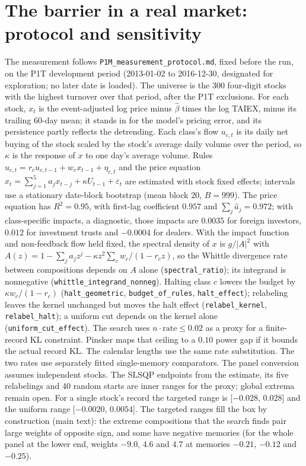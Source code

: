 \documentclass[12pt]{article}
\theoremstyle{definition}
\theoremstyle{remark}
\begin{document}
\section{The barrier in a real market: protocol and sensitivity}\label{app:barrier}

The measurement follows \nolinkurl{P1M_measurement_protocol.md}, fixed before the run, on the P1T development period (2013-01-02 to 2016-12-30, designated for exploration; no later date is loaded). The universe is the 300 four-digit stocks with the highest turnover over that period, after the P1T exclusions. For each stock, $x_t$ is the event-adjusted log price minus $\hat\beta$ times the log TAIEX, minus its trailing 60-day mean; it stands in for the model's pricing error, and its persistence partly reflects the detrending. Each class's flow $u_{c,t}$ is its daily net buying of the stock scaled by the stock's average daily volume over the period, so $\kappa$ is the response of $x$ to one day's average volume. Rules $u_{c,t}=r_cu_{c,t-1}+w_cx_{t-1}+\eta_{c,t}$ and the price equation $x_t=\sum_{j=1}^5a_jx_{t-j}+\kappa U_{t-1}+\varepsilon_t$ are estimated with stock fixed effects; intervals use a stationary date-block bootstrap (mean block 20, $B=999$). The price equation has $R^2=0.95$, with first-lag coefficient $0.957$ and $\sum_j\hat a_j=0.972$; with class-specific impacts, a diagnostic, those impacts are $0.0035$ for foreign investors, $0.012$ for investment trusts and $-0.0004$ for dealers. With the impact function and non-feedback flow held fixed, the spectral density of $x$ is $g/|A|^2$ with $A(z)=1-\sum_ja_jz^j-\kappa z^{2}\sum_cw_c/(1-r_cz)$, so the Whittle divergence rate between compositions depends on $A$ alone (\nolinkurl{spectral_ratio}); its integrand is nonnegative (\nolinkurl{whittle_integrand_nonneg}). Halting class $c$ lowers the budget by $\kappa w_c/(1-r_c)$ (\nolinkurl{halt_geometric}, \nolinkurl{budget_of_rules}, \nolinkurl{halt_effect}); relabeling leaves the kernel unchanged but moves the halt effect (\nolinkurl{relabel_kernel}, \nolinkurl{relabel_halt}); a uniform cut depends on the kernel alone (\nolinkurl{uniform_cut_effect}). The search uses $n\cdot\mathrm{rate}\le0.02$ as a proxy for a finite-record KL constraint. Pinsker maps that ceiling to a $0.10$ power gap if it bounds the actual record KL. The calendar lengths use the same rate substitution. The two rates use separately fitted single-memory comparators. The panel conversion assumes independent stocks. The SLSQP endpoints from the estimate, its five relabelings and 40 random starts are inner ranges for the proxy; global extrema remain open. For a single stock's record the targeted range is [$-0.028$, $0.028$] and the uniform range [$-0.0020$, $0.0054$]. The targeted ranges fill the box by construction (main text): the extreme compositions that the search finds pair large weights of opposite sign, and some have negative memories (for the whole panel at the lower end, weights $-9.0$, $4.6$ and $4.7$ at memories $-0.21$, $-0.12$ and $-0.25$).
\end{document}
